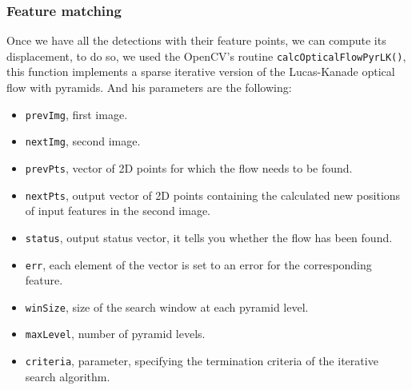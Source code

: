 

\subsubsection{Feature matching}


Once we have all the detections with their feature points, we can compute its displacement, to do so,  we used the OpenCV's routine \texttt{calcOpticalFlowPyrLK()}, this function implements a sparse iterative version of the Lucas-Kanade optical flow with pyramids. And his parameters are the following:
 
\begin{itemize}

\item \texttt{prevImg}, first image.
\item \texttt{nextImg}, second image.
\item \texttt{prevPts}, vector of 2D points for which the flow needs to be found. 
\item \texttt{nextPts}, output vector of 2D points containing the calculated new positions of input features in the second image. 
\item \texttt{status}, output status vector, it tells you whether the flow has been found.  
\item \texttt{err}, each element of the vector is set to an error for the corresponding feature.
\item \texttt{winSize}, size of the search window at each pyramid level. 
\item \texttt{maxLevel}, number of pyramid levels.  
\item \texttt{criteria}, parameter, specifying the termination criteria of the iterative search algorithm.
\end{itemize}



